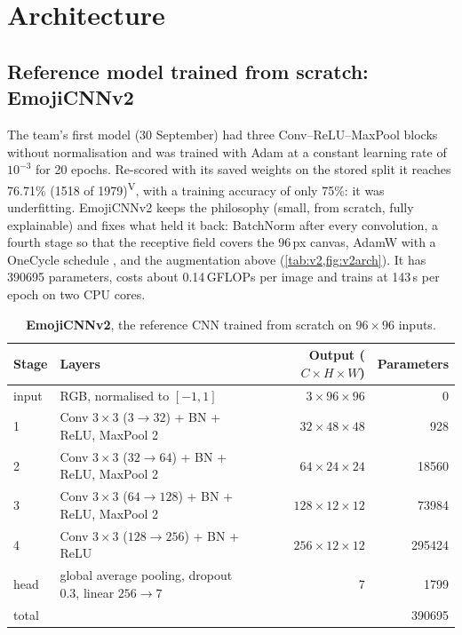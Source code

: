 \documentclass[11pt,a4paper]{article}
\newcommand{\ver}{\textsuperscript{\textcolor{verified}{\sffamily\scriptsize V}}}
\newcommand{\pct}[1]{#1\%}
\begin{document}
\section{Architecture}
\label{sec:arch}

\subsection{Reference model trained from scratch: EmojiCNNv2}
The team's first model (30 September) had three Conv--ReLU--MaxPool blocks without normalisation and was trained with Adam at a constant learning rate of $10^{-3}$ for 20 epochs. Re-scored with its saved weights on the stored split it reaches \pct{76.71} (\num{1518} of \num{1979})\ver, with a training accuracy of only \pct{75}: it was underfitting. EmojiCNNv2 keeps the philosophy (small, from scratch, fully explainable) and fixes what held it back: BatchNorm after every convolution, a fourth stage so that the receptive field covers the 96\,px canvas, AdamW \cite{loshchilov2019adamw} with a OneCycle schedule \cite{smith2019superconvergence}, and the augmentation above (\cref{tab:v2,fig:v2arch}). It has \num{390695} parameters, costs about 0.14\,GFLOPs per image and trains at 143\,s per epoch on two CPU cores.

\begin{table}[t]
\centering\small
\caption{\textbf{EmojiCNNv2}, the reference CNN trained from scratch on $96\times96$ inputs.}
\label{tab:v2}
\begin{tabular}{@{}llrr@{}}
\toprule
Stage & Layers & Output ($C\times H\times W$) & Parameters\\
\midrule
input & RGB, normalised to $[-1,1]$ & $3\times96\times96$ & 0\\
1 & Conv $3{\times}3$ ($3\to32$) + BN + ReLU, MaxPool 2 & $32\times48\times48$ & 928\\
2 & Conv $3{\times}3$ ($32\to64$) + BN + ReLU, MaxPool 2 & $64\times24\times24$ & \num{18560}\\
3 & Conv $3{\times}3$ ($64\to128$) + BN + ReLU, MaxPool 2 & $128\times12\times12$ & \num{73984}\\
4 & Conv $3{\times}3$ ($128\to256$) + BN + ReLU & $256\times12\times12$ & \num{295424}\\
head & global average pooling, dropout 0.3, linear $256\to7$ & 7 & \num{1799}\\
\midrule
total & & & \num{390695}\\
\bottomrule
\end{tabular}
\end{table}
\end{document}
